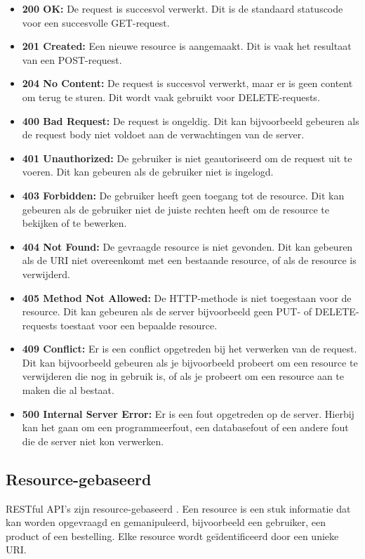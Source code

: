 \begin{itemize}
  \item \textbf{200 OK:} De request is succesvol verwerkt. Dit is de standaard statuscode voor een succesvolle GET-request.
  \item \textbf{201 Created:} Een nieuwe resource is aangemaakt. Dit is vaak het resultaat van een POST-request.
  \item \textbf{204 No Content:} De request is succesvol verwerkt, maar er is geen content om terug te sturen. Dit wordt vaak gebruikt voor DELETE-requests.
  \item \textbf{400 Bad Request:} De request is ongeldig. Dit kan bijvoorbeeld gebeuren als de request body niet voldoet aan de verwachtingen van de server.
  \item \textbf{401 Unauthorized:} De gebruiker is niet geautoriseerd om de request uit te voeren. Dit kan gebeuren als de gebruiker niet is ingelogd.
  \item \textbf{403 Forbidden:} De gebruiker heeft geen toegang tot de resource. Dit kan gebeuren als de gebruiker niet de juiste rechten heeft om de resource te bekijken of te bewerken.
  \item \textbf{404 Not Found:} De gevraagde resource is niet gevonden. Dit kan gebeuren als de URI niet overeenkomt met een bestaande resource, of als de resource is verwijderd.
  \item \textbf{405 Method Not Allowed:} De HTTP-methode is niet toegestaan voor de resource. Dit kan gebeuren als de server bijvoorbeeld geen PUT- of DELETE-requests toestaat voor een bepaalde resource.
  \item \textbf{409 Conflict:} Er is een conflict opgetreden bij het verwerken van de request. Dit kan bijvoorbeeld gebeuren als je bijvoorbeeld probeert om een resource te verwijderen die nog in gebruik is, of als je probeert om een resource aan te maken die al bestaat.
  \item \textbf{500 Internal Server Error:} Er is een fout opgetreden op de server. Hierbij kan het gaan om een programmeerfout, een databasefout of een andere fout die de server niet kon verwerken.
\end{itemize}

\subsection{Resource-gebaseerd}

RESTful API's zijn resource-gebaseerd \autocite{Fielding2000}. Een resource is een stuk informatie dat kan worden opgevraagd en gemanipuleerd, bijvoorbeeld een gebruiker, een product of een bestelling. Elke resource wordt geïdentificeerd door een unieke URI.


